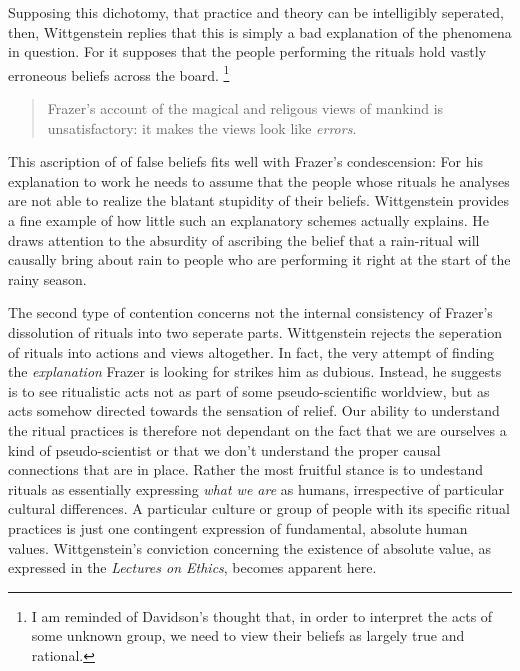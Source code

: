 \documentclass{article}
\begin{document}
Supposing this dichotomy, that practice and theory can be intelligibly seperated, then, Wittgenstein replies that this is simply a bad explanation of the phenomena in question. For it supposes that the people performing the rituals hold vastly erroneous beliefs across the board. \footnote{I am reminded of Davidson's thought that, in order to interpret the acts of some unknown group, we need to view their beliefs as largely true and rational.}
\begin{quote}
Frazer's account of the magical and religous views of mankind is unsatisfactory: it makes the views look like \textit{errors}.
\end{quote} 
This ascription of of false beliefs fits well with Frazer's condescension: For his explanation to work he needs to assume that the people whose rituals he analyses are not able to realize the blatant stupidity of their beliefs. Wittgenstein provides a fine example of how little such an explanatory schemes actually explains. He draws attention to the absurdity of ascribing the belief that a rain-ritual will causally bring about rain to people who are performing it right at the start of the rainy season.

The second type of contention concerns not the internal consistency of Frazer's dissolution of rituals into two seperate parts. Wittgenstein rejects the seperation of rituals into actions and views altogether.
In fact, the very attempt of finding the \textit{explanation} Frazer is looking for strikes him as dubious.
Instead, he suggests is to see ritualistic acts not as part of some pseudo-scientific worldview, but as acts somehow directed towards the sensation of relief. Our ability to understand the ritual practices is therefore not dependant on the fact that we are ourselves a kind of pseudo-scientist or that we don't understand the proper causal connections that are in place. Rather the most fruitful stance is to undestand rituals as essentially expressing \textit{what we are} as humans, irrespective of particular cultural differences. A particular culture or group of people with its specific ritual practices is just one contingent expression of fundamental, absolute human values. Wittgenstein's conviction concerning the existence of absolute value, as expressed in the \textit{Lectures on Ethics}, becomes apparent here.
\end{document}
